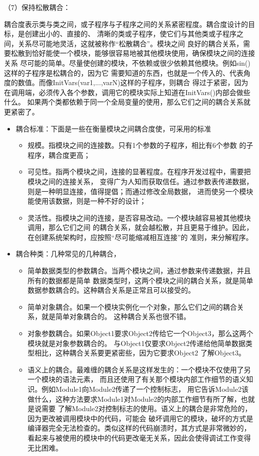 \documentclass{article}
\begin{document}
\par
（7）保持松散耦合：
\par
耦合度表示类与类之间，或子程序与子程序之间的关系紧密程度。耦合度设计的目标，是创建出小的、直接的、
清晰的类或子程序，使它们与其他类或子程序之间，关系尽可能地灵活，这就被称作“松散耦合”。模块之间
良好的耦合关系，需要松散到恰好能使一个模块，能够很容易地被其他模块使用，确保模块之间的连接关系
尽可能的简单。尽量使创建的模块，不依赖或很少依赖其他模块。例如sin()这样的子程序是松耦合的，因为它
需要知道的东西，也就是一个传入的、代表角度的数值。而像InitVars(var1,...,varN)这样的子程序，则耦合
得过于紧密，因为在调用端，必须传入各个参数，调用它的模块实际上知道在InitVars()内部会做些什么。
如果两个类都依赖于同一个全局变量的使用，那么它们之间的耦合关系就更紧密了。
\begin{itemize}
    \item 耦合标准：下面是一些在衡量模块之间耦合度使，可采用的标准
    \begin{itemize}
        \item 规模。指模块之间的连接数。只有1个参数的子程序，相比有6个参数
        的子程序，耦合度更高；
        \item 可见性。指两个模块之间，连接的显著程度。在程序开发过程中，需要把模块之间的连接关系，
        变得广为人知而获取信任。通过参数表传递数据，则是一种明显连接，值得提倡；而通过修改全局数据，
        进而使另一个模块能使用该数据，则是一种不好的设计；
        \item 灵活性。指模块之间的连接，是否容易改动。一个模块越容易被其他模块调用，那么它们之间
        的耦合关系，就会越松散，并且更易于维护。因此，在创建系统架构时，应按照“尽可能缩减相互连接”的
        准则，来分解程序。
    \end{itemize}
    \item 耦合种类：几种常见的几种耦合，
    \begin{itemize}
        \item 简单数据类型的参数耦合。当两个模块之间，通过参数来传递数据，并且所有的数据都是简单
        数据类型时，这两个模块之间的耦合关系，就是简单数据参数耦合的。这种耦合关系是正常且可以接受的。
        \item 简单对象耦合。如果一个模块实例化一个对象，那么它们之间的耦合关系，就是简单对象耦合的。
        这种耦合关系也很不错。
        \item 对象参数耦合。如果Object1要求Object2传给它一个Object3，那么这两个模块就是对象参数耦合的。
        与Object1仅要求Object2传递给他简单数据类型相比，这种耦合关系要更紧密些，因为它要求Object2
        了解Object3。
        \item 语义上的耦合。最难缠的耦合关系是这样发生的：一个模块不仅使用了另一个模块的语法元素，
        而且还使用了有关那个模块内部工作细节的语义知识。例如Module1向Module2传递了一个控制标志，
        用它告诉Module2该做什么，这种方法要求Module1对Module2的内部工作细节有所了解，也就是说需要
        了解Module2对控制标志的使用。语义上的耦合是非常危险的，因为更改被调用模块中的代码，可能会
        破坏调用它的模块，破坏的方式是编译器完全无法检查的。类似这样的代码崩溃时，其方式是非常微妙的，
        看起来与被使用的模块中的代码更改毫无关系，因此会使得调试工作变得无比困难。
    \end{itemize}
\end{itemize}
\end{document}
